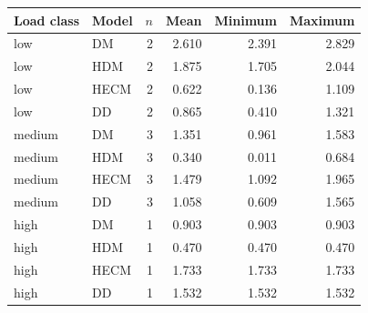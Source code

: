 \begin{tabular}{llrrrr}
\toprule
Load class & Model & $n$ & Mean & Minimum & Maximum \\
\midrule
low & DM & 2 & 2.610 & 2.391 & 2.829 \\
low & HDM & 2 & 1.875 & 1.705 & 2.044 \\
low & HECM & 2 & 0.622 & 0.136 & 1.109 \\
low & DD & 2 & 0.865 & 0.410 & 1.321 \\
medium & DM & 3 & 1.351 & 0.961 & 1.583 \\
medium & HDM & 3 & 0.340 & 0.011 & 0.684 \\
medium & HECM & 3 & 1.479 & 1.092 & 1.965 \\
medium & DD & 3 & 1.058 & 0.609 & 1.565 \\
high & DM & 1 & 0.903 & 0.903 & 0.903 \\
high & HDM & 1 & 0.470 & 0.470 & 0.470 \\
high & HECM & 1 & 1.733 & 1.733 & 1.733 \\
high & DD & 1 & 1.532 & 1.532 & 1.532 \\
\bottomrule
\end{tabular}
